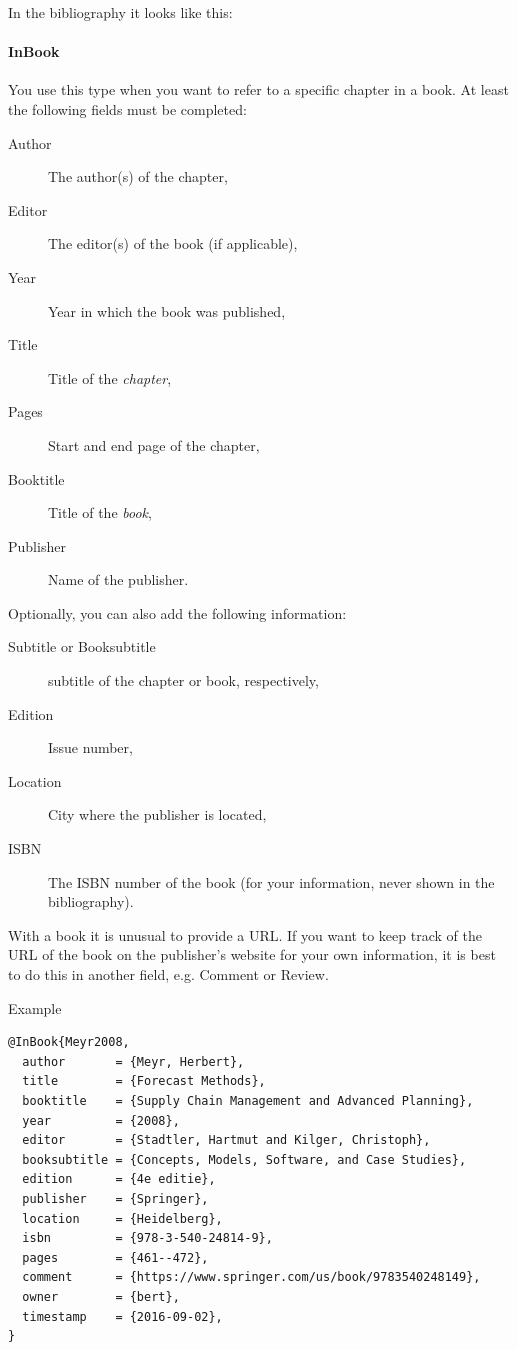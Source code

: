 In the bibliography it looks like this: 

\paragraph{InBook}

You use this type when you want to refer to a specific chapter in a book. At least the following fields must be completed:

\begin{description}
 \item[Author] The author(s) of the chapter,
 \item[Editor] The editor(s) of the book (if applicable),
 \item[Year] Year in which the book was published,
 \item[Title] Title of the \emph{chapter},
 \item[Pages] Start and end page of the chapter,
 \item[Booktitle] Title of the \emph{book},
 \item[Publisher] Name of the publisher.
\end{description}

Optionally, you can also add the following information:

\begin{description}
  \item[Subtitle or Booksubtitle] subtitle of the chapter or book, respectively,
  \item[Edition] Issue number,
  \item[Location] City where the publisher is located,
  \item[ISBN] The ISBN number of the book (for your information, never shown in the bibliography).
\end{description}

With a book it is unusual to provide a URL. If you want to keep track of the URL of the book on the publisher's website for your own information, it is best to do this in another field, e.g. Comment or Review.

Example
\begin{verbatim}
@InBook{Meyr2008,
  author       = {Meyr, Herbert},
  title        = {Forecast Methods},
  booktitle    = {Supply Chain Management and Advanced Planning},
  year         = {2008},
  editor       = {Stadtler, Hartmut and Kilger, Christoph},
  booksubtitle = {Concepts, Models, Software, and Case Studies},
  edition      = {4e editie},
  publisher    = {Springer},
  location     = {Heidelberg},
  isbn         = {978-3-540-24814-9},
  pages        = {461--472},
  comment      = {https://www.springer.com/us/book/9783540248149},
  owner        = {bert},
  timestamp    = {2016-09-02},
}
\end{verbatim}


